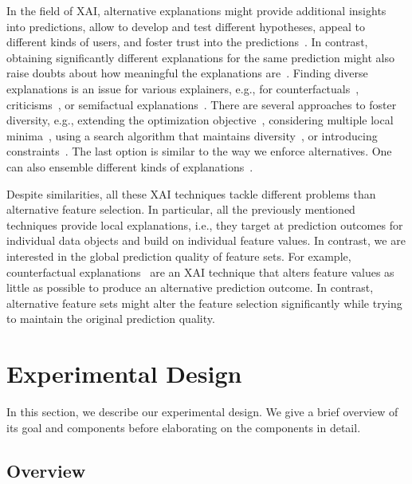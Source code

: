 \documentclass{article}
\theoremstyle{definition}
\begin{document}
In the field of XAI, alternative explanations might provide additional insights into predictions, allow to develop and test different hypotheses, appeal to different kinds of users, and foster trust into the predictions~\cite{kim2021multi, wang2019designing}.
In contrast, obtaining significantly different explanations for the same prediction might also raise doubts about how meaningful the explanations are~\cite{jain2019attention}.
Finding diverse explanations is an issue for various explainers, e.g., for counterfactuals~\cite{dandl2020multi, karimi2020model, mohammadi2021scaling, mothilal2020explaining, russell2019efficient, wachter2017counterfactual}, criticisms~\cite{kim2016examples}, or semifactual explanations~\cite{artelt2022even}.
There are several approaches to foster diversity, e.g., extending the optimization objective~\cite{artelt2022even, kim2016examples, mothilal2020explaining}, considering multiple local minima~\cite{wachter2017counterfactual}, using a search algorithm that maintains diversity~\cite{dandl2020multi}, or introducing constraints~\cite{karimi2020model, mohammadi2021scaling, russell2019efficient}.
The last option is similar to the way we enforce alternatives.
One can also ensemble different kinds of explanations~\cite{silva2019produce}.

Despite similarities, all these XAI techniques tackle different problems than alternative feature selection.
In particular, all the previously mentioned techniques provide local explanations, i.e., they target at prediction outcomes for individual data objects and build on individual feature values.
In contrast, we are interested in the global prediction quality of feature sets.
For example, counterfactual explanations~\cite{guidotti2022counterfactual, stepin2021survey, verma2020counterfactual} are an XAI technique that alters feature values as little as possible to produce an alternative prediction outcome.
In contrast, alternative feature sets might alter the feature selection significantly while trying to maintain the original prediction quality.

\section{Experimental Design}
\label{sec:afs:experimental-design}

In this section, we describe our experimental design.
We give a brief overview of its goal and components before elaborating on the components in detail.

\subsection{Overview}
\label{sec:afs:experimental-design:overview}
\end{document}
